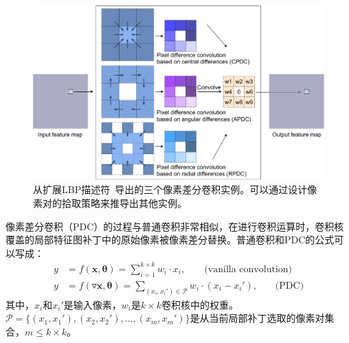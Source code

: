 \documentclass[10pt,twocolumn,letterpaper]{article}
\begin{document}
\begin{figure}[t!]
    \centering
    \includegraphics[width=1\linewidth]{images/pdc.pdf}
    \caption{从扩展LBP描述符~\cite{liu2011sorted, liu2012extended, su2019bird}导出的三个像素差分卷积实例。可以通过设计像素对的拾取策略来推导出其他实例。}
    \label{fig:pdc}
\end{figure}

像素差分卷积（PDC）的过程与普通卷积非常相似，在进行卷积运算时，卷积核覆盖的局部特征图补丁中的原始像素被像素差分替换。普通卷积和PDC的公式可以写成：
\begin{align}
    y &= f(\pmb{x}, \pmb{\theta}) = \sum_{i=1}^{k\times k}w_{i}\cdot x_{i}, \;\;\;\;\;\;\; \text{(vanilla convolution)} \\
    y &= f(\triangledown\pmb{x}, \pmb{\theta}) = \sum_{(x_i, x_i')\in \pmb{\mathcal{P}}}w_{i}\cdot (x_i - x_i'), \;\;\;\;\;\;\, \text{(PDC)} \label{eq: pdc}
\end{align}
其中，$ x_i $和$ x_i' $是输入像素，$ w_i $是$ k \times k $卷积核中的权重。$ \pmb{\mathcal{P}} = \{(x_1, x_1'), (x_2, x_2'), ..., (x_m, x_m')\} $是从当前局部补丁选取的像素对集合，$ m \le k \times k $。
\end{document}
